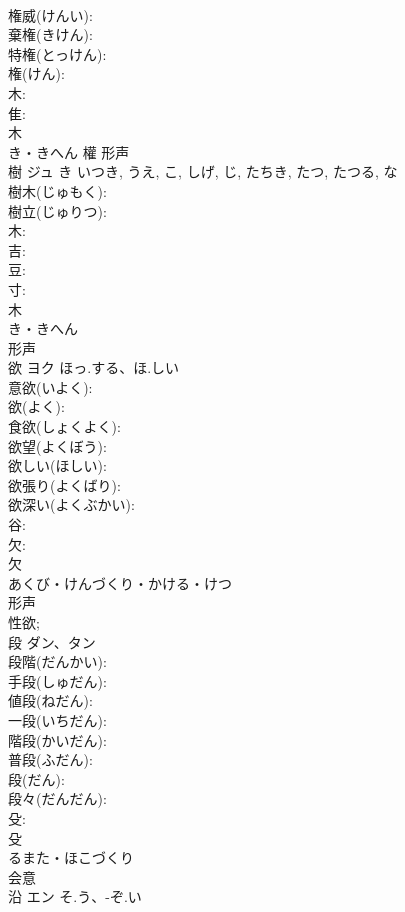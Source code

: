 \documentclass[8pt]{extreport}
\begin{document}
\begin{CJK}{UTF8}{min}
\\	権威(けんい): 
\\	棄権(きけん): 
\\	特権(とっけん): 
\\	権(けん): 
\\	木: 
\\	隹: 
\\	木	
\\	き・きへん	權	形声 
\\	樹	ジュ	き	いつき, うえ, こ, しげ, じ, たちき, たつ, たつる, な	
\\	樹木(じゅもく): 
\\	樹立(じゅりつ): 
\\	木: 
\\	吉: 
\\	豆: 
\\	寸: 
\\	木	
\\	き・きへん	
\\	形声 
\\	欲	ヨク	ほっ.する、ほ.しい		
\\	意欲(いよく): 
\\	欲(よく): 
\\	食欲(しょくよく): 
\\	欲望(よくぼう): 
\\	欲しい(ほしい): 
\\	欲張り(よくばり): 
\\	欲深い(よくぶかい): 
\\	谷: 
\\	欠: 
\\	欠	
\\	あくび・けんづくり・かける・けつ	
\\	形声 
\\	性欲; 
\\	段	ダン、タン			
\\	段階(だんかい): 
\\	手段(しゅだん): 
\\	値段(ねだん): 
\\	一段(いちだん): 
\\	階段(かいだん): 
\\	普段(ふだん): 
\\	段(だん): 
\\	段々(だんだん): 
\\	殳: 
\\	殳	
\\	るまた・ほこづくり	
\\	会意 
\\	沿	エン	そ.う、-ぞ.い		

\end{CJK}
\end{document}
